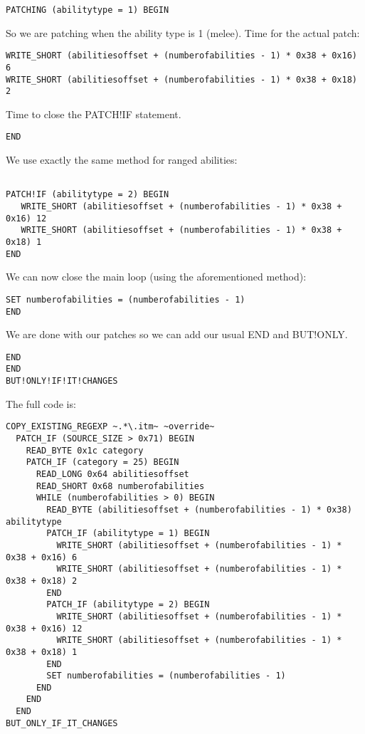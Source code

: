 \documentclass{article}
\begin{document}
\begin{verbatim}
PATCHING (abilitytype = 1) BEGIN
\end{verbatim}
So we are patching when the ability type is 1 (melee). Time for the actual patch:
\begin{verbatim}
WRITE_SHORT (abilitiesoffset + (numberofabilities - 1) * 0x38 + 0x16) 6
WRITE_SHORT (abilitiesoffset + (numberofabilities - 1) * 0x38 + 0x18) 2
\end{verbatim}
Time to close the PATCH!IF statement.
\begin{verbatim}
END
\end{verbatim}
We use exactly the same method for ranged abilities:
\begin{verbatim}

PATCH!IF (abilitytype = 2) BEGIN
   WRITE_SHORT (abilitiesoffset + (numberofabilities - 1) * 0x38 + 0x16) 12
   WRITE_SHORT (abilitiesoffset + (numberofabilities - 1) * 0x38 + 0x18) 1
END
\end{verbatim}
We can now close the main loop (using the aforementioned method):
\begin{verbatim}
SET numberofabilities = (numberofabilities - 1)
END
\end{verbatim}
We are done with our patches so we can add our usual END and BUT!ONLY.
\begin{verbatim}
END
END
BUT!ONLY!IF!IT!CHANGES
\end{verbatim}
The full code is:
\begin{verbatim}
COPY_EXISTING_REGEXP ~.*\.itm~ ~override~
  PATCH_IF (SOURCE_SIZE > 0x71) BEGIN
    READ_BYTE 0x1c category
    PATCH_IF (category = 25) BEGIN
      READ_LONG 0x64 abilitiesoffset
      READ_SHORT 0x68 numberofabilities
      WHILE (numberofabilities > 0) BEGIN
        READ_BYTE (abilitiesoffset + (numberofabilities - 1) * 0x38) abilitytype
        PATCH_IF (abilitytype = 1) BEGIN
          WRITE_SHORT (abilitiesoffset + (numberofabilities - 1) * 0x38 + 0x16) 6
          WRITE_SHORT (abilitiesoffset + (numberofabilities - 1) * 0x38 + 0x18) 2
        END
        PATCH_IF (abilitytype = 2) BEGIN
          WRITE_SHORT (abilitiesoffset + (numberofabilities - 1) * 0x38 + 0x16) 12
          WRITE_SHORT (abilitiesoffset + (numberofabilities - 1) * 0x38 + 0x18) 1
        END
        SET numberofabilities = (numberofabilities - 1)
      END
    END
  END
BUT_ONLY_IF_IT_CHANGES
\end{verbatim}
\end{document}
